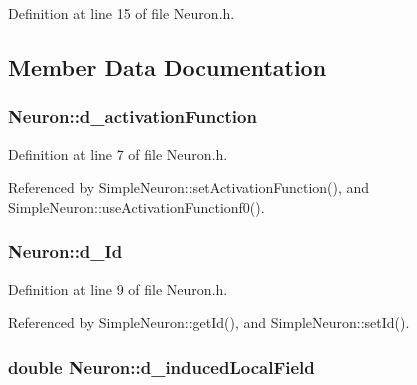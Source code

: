 Definition at line 15 of file Neuron.h.



\subsection{Member Data Documentation}
\hypertarget{class_neuron_ad530e9f0bb556e0469b5074e6b7f463f}{
\subsubsection[{d\_\-activationFunction}]{ {\bf Neuron::d\_\-activationFunction}}}
\label{class_neuron_ad530e9f0bb556e0469b5074e6b7f463f}


Definition at line 7 of file Neuron.h.



Referenced by SimpleNeuron::setActivationFunction(), and SimpleNeuron::useActivationFunctionf0().

\hypertarget{class_neuron_ab1a34e30b663c41342e8f8eaac8bd466}{
\subsubsection[{d\_\-Id}]{ {\bf Neuron::d\_\-Id}}}
\label{class_neuron_ab1a34e30b663c41342e8f8eaac8bd466}


Definition at line 9 of file Neuron.h.



Referenced by SimpleNeuron::getId(), and SimpleNeuron::setId().

\hypertarget{class_neuron_a4370eae5b594fb4c7f544fcefa298c7c}{
\subsubsection[{d\_\-inducedLocalField}]{\setlength{\rightskip}{0pt plus 5cm}double {\bf Neuron::d\_\-inducedLocalField}}}
\label{class_neuron_a4370eae5b594fb4c7f544fcefa298c7c}


